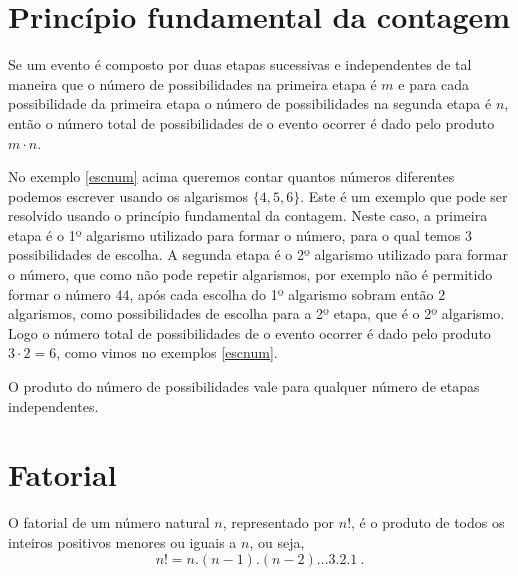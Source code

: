 \section{Princípio fundamental da contagem}

 \vskip0.3cm
 \colorbox{azul}{
 \begin{minipage}{14.5cm}
 \begin{center}
  Se um evento é composto por duas etapas sucessivas e independentes de tal maneira que o número de possibilidades na primeira etapa é $m$ e para cada possibilidade da primeira etapa o número de possibilidades na segunda etapa é $n$, então o número total de possibilidades de o evento ocorrer é dado pelo produto $m \cdot n$.
 \end{center}
 \end{minipage}}
 \vskip0.3cm
 
No exemplo \ref{escnum} acima queremos contar quantos números diferentes podemos escrever usando os algarismos $\{4,5,6\}$. Este é um exemplo que pode ser resolvido usando o princípio fundamental da contagem. Neste caso, a primeira etapa é o 1º algarismo utilizado para formar o número, para o qual temos $3$ possibilidades de escolha. A segunda etapa é o 2º algarismo utilizado para formar o número, que como não pode repetir algarismos, por exemplo não é permitido formar o número $44$, após cada escolha do 1º algarismo sobram então $2$ algarismos, como possibilidades de escolha para a 2º etapa, que é o 2º algarismo. Logo o número total de possibilidades de o evento ocorrer é dado pelo produto $3 \cdot 2= 6$, como vimos no exemplos \ref{escnum}.

\begin{obs}
 O produto do número de possibilidades vale para qualquer número de etapas independentes.
\end{obs}


\section{Fatorial}

\vskip0.3cm
 \colorbox{azul}{
 \begin{minipage}{14.5cm}
 \begin{center}
  O fatorial de um número natural $n$, representado por $n!$, é o produto de todos os inteiros positivos menores ou iguais a $n$, ou seja,
 \[n! = n.(n-1).(n-2)...3.2.1 \ . \]
 \end{center}
 \end{minipage}}
 \vskip0.3cm

